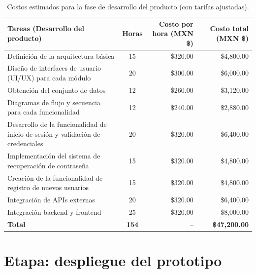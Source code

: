 \begin{table}[H]
	\centering
	\renewcommand{\arraystretch}{1.6}
	\setlength{\tabcolsep}{10pt}
	\Huge
	\begin{adjustbox}{max width=\textwidth}
		\begin{tabular}{|p{9.5cm}|c|r|r|}
			\hline
			\textbf{Tareas (Desarrollo del producto)} & \textbf{Horas} & \textbf{Costo por hora (MXN \$)} & \textbf{Costo total (MXN \$)} \\ \hline
			Definición de la arquitectura básica & 15 & \$320.00 & \$4,800.00 \\ \hline
			Diseño de interfaces de usuario (UI/UX) para cada módulo & 20 & \$300.00 & \$6,000.00 \\ \hline
			Obtención del conjunto de datos & 12 & \$260.00 & \$3,120.00 \\ \hline
			Diagramas de flujo y secuencia para cada funcionalidad & 12 & \$240.00 & \$2,880.00 \\ \hline
			Desarrollo de la funcionalidad de inicio de sesión y validación de credenciales & 20 & \$320.00 & \$6,400.00 \\ \hline
			Implementación del sistema de recuperación de contraseña & 15 & \$320.00 & \$4,800.00 \\ \hline
			Creación de la funcionalidad de registro de nuevos usuarios & 15 & \$320.00 & \$4,800.00 \\ \hline
			Integración de APIs externas & 20 & \$320.00 & \$6,400.00 \\ \hline
			Integración backend y frontend & 25 & \$320.00 & \$8,000.00 \\ \hline
			\textbf{Total} & \textbf{154} & -- & \textbf{\$47,200.00} \\ \hline
		\end{tabular}
	\end{adjustbox}
	\caption{Costos estimados para la fase de desarrollo del producto (con tarifas ajustadas).}
	\label{tab:costos_desarrollo_actualizado}
\end{table}


\section{Etapa: despliegue del prototipo}

